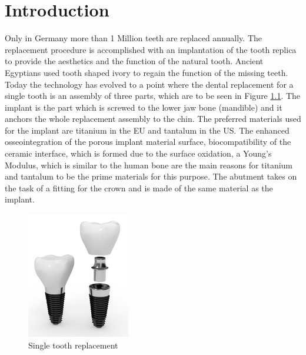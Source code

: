 \cleardoublepage
{}


\chapter{Introduction}
\label{sec:problemstellung}
 Only in Germany more than 1 Million teeth are replaced annually. The replacement procedure is accomplished with an implantation of the tooth replica to provide the aesthetics and the function of the natural tooth. Ancient Egyptians used tooth shaped ivory to regain the function of the missing teeth. Today the technology has evolved to a point where the dental replacement for a single tooth is an assembly of three parts, which  are to be seen in Figure \ref{fig:implant}. The implant is the part which is screwed to the lower jaw bone (mandible) and it anchors the whole replacement assembly to the chin. The preferred materials used for the implant are titanium in the EU and tantalum in the US. The enhanced osseointegration of the porous implant material surface, biocompatibility of the ceramic interface, which is formed due to the surface oxidation, a Young's Modulus, which is similar to the human bone are the main reasons for titanium and tantalum to be the prime materials for this purpose. The abutment takes on the task of a fitting  for the crown and is made of the same material as the implant.
 
 \bigskip
 
  \begin{figure}[H]
 	\centering
 	\includegraphics[width=0.4\textwidth]{grafiken/implant.png}
 	\caption{Single tooth replacement}
 	\label{fig:implant}
 \end{figure} 

